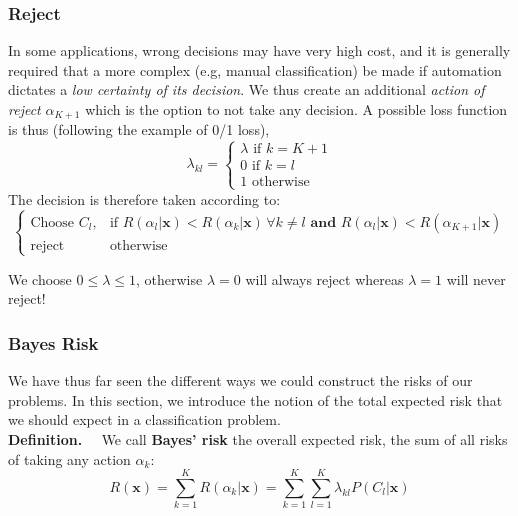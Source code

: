 \documentclass[a4paper,12pt]{article}
\newcommand{\xx}{{\bm x}}
\begin{document}
\subsubsection{Reject}
In some applications, wrong decisions may have very high cost, and it is generally required that a more complex (e.g, manual classification) be made if automation dictates a \textit{low certainty of its decision}. We thus create an additional \textit{action of reject} $\alpha_{K+1}$ which is the option to not take any decision. A possible loss function is thus (following the example of 0/1 loss),
\begin{equation*}
\lambda_{kl} = 
\begin{cases}
\lambda \text{ if } k = K+1
\\
0 \text{ if } k = l
\\
1 \text{ otherwise}
\end{cases}
\end{equation*} 
The decision is therefore taken according to:
\begin{equation*}
\begin{cases}
\text{Choose } C_l, & \text{if } R(\alpha_l|\xx) < R(\alpha_k|\xx)\, \forall k \neq l \textbf{ and } R(\alpha_l|\xx) < R(\alpha_{K+1}|\xx) \\
\text{reject } & \text{otherwise}
\end{cases}
\end{equation*}

We choose $0 \leq \lambda \leq 1$, otherwise $\lambda = 0$ will always reject whereas $\lambda = 1$ will never reject!
\subsubsection{Bayes Risk}
We have thus far seen the different ways we could construct the risks of our problems. In this section, we introduce the notion of the total expected risk that we should expect in a classification problem. \\

\textbf{Definition. $\quad$}We call \textbf{Bayes' risk} the overall expected risk, the sum of all risks of taking any action $\alpha_k$:
\begin{equation*}
R(\xx) = \sum_{k=1}^{K} R(\alpha_k|\xx) = \sum_{k=1}^{K}{\sum_{l = 1}^{K}{\lambda_{kl}P(C_{l}|\xx)}}
\end{equation*}
\end{document}
